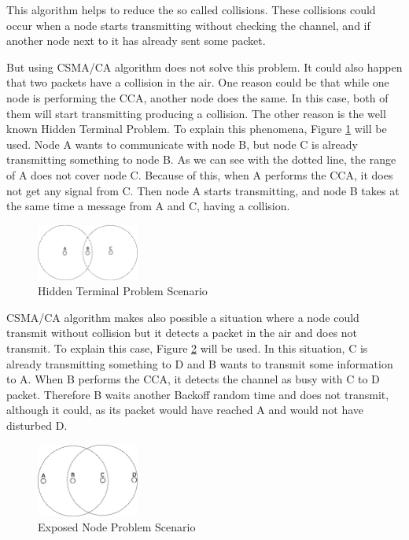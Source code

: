 This algorithm helps to reduce the so called collisions. These collisions could occur when a node starts transmitting without checking the 
channel, and if another node next to it has already sent some packet.

But using \ac{CSMA/CA} algorithm does not solve this problem. It could also happen that two packets have a collision in the air. One 
reason could be that while one node is performing the \ac{CCA}, another node does the same. In this case, both of them will start transmitting 
producing a collision. The other reason is the well known Hidden Terminal Problem. To explain this phenomena, Figure \ref{fig:HiddenTerminalProblem}
will be used. Node A wants to communicate with node B, but node C is already transmitting something to node B. As we can see with the dotted line,
the range of A does not cover node C. Because of this, when A performs the \ac{CCA}, it does not get any signal from C. Then node A starts transmitting, and 
node B takes at the same time a message from A and C, having a collision.

\begin{figure}[!ht]
 \begin{center}
  \includegraphics[width=0.3\textwidth]{HiddenTerminalProblem.eps}
 \end{center}
 \caption{Hidden Terminal Problem Scenario}
 \label{fig:HiddenTerminalProblem}
\end{figure}

\ac{CSMA/CA} algorithm makes also possible a situation where a node could transmit without collision but it detects a packet in the air and does
not transmit. To explain this case, Figure \ref{fig:ExposedNodeProblem} will be used. In this situation, C is already transmitting something to D and B 
wants to transmit some information to A. When B performs the \ac{CCA}, it detects the channel as busy with C to D packet. Therefore B waits another
Backoff random time and does not transmit, although it could, as its packet would have reached A and would not have disturbed D.

\begin{figure}[!ht]
 \begin{center}
  \includegraphics[width=0.3\textwidth]{ExposedNodeProblem.eps}
 \end{center}
 \caption{Exposed Node Problem Scenario}
 \label{fig:ExposedNodeProblem}
\end{figure}


